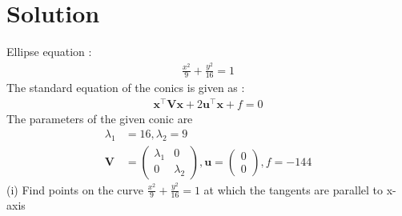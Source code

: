 \documentclass[10pt, a4paper]{article}
\newcommand{\myvec}[1]{\ensuremath{\begin{pmatrix}#1\end{pmatrix}}}
\let\vec\mathbf
\begin{document}
  \section{Solution}

Ellipse equation : \begin{align}
\frac{x^2}{9}+\frac{y^2}{16}=1
  \end{align}
The standard equation of the conics is given as :
\begin{align}
\vec{x}^{\top}\vec{V}\vec{x}+2\vec{u}^{\top}\vec{x}+f=0
\end{align}
\fi
The parameters of the given conic are
\begin{align}
	\lambda_1&=16,\lambda_2=9 \\ \vec{V} &= \myvec{	\lambda_1& 0 \\
			          0 & \lambda_2}  
		    , \vec{u} = \myvec{0 \\0}, f = -144
		\label{eq:12/6/3/13/params}
	\end{align}
	\iffalse
	(i) Find points on the curve $\frac{x^2}{9}+\frac{y^2}{16}=1$ at which the tangents are parallel to x-axis\\
	
\end{document}
